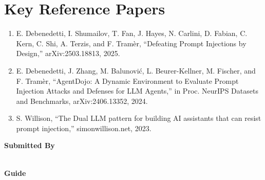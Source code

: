 \documentclass[11pt]{article}
\begin{document}
\section*{Key Reference Papers}
\begin{enumerate}
  \item E. Debenedetti, I. Shumailov, T. Fan, J. Hayes, N. Carlini, D. Fabian, C. Kern, C. Shi, A. Terzis, and F. Tram\`{e}r, ``Defeating Prompt Injections by Design,'' arXiv:2503.18813, 2025.
  \item E. Debenedetti, J. Zhang, M. Balunovi\'{c}, L. Beurer-Kellner, M. Fischer, and F. Tram\`{e}r, ``AgentDojo: A Dynamic Environment to Evaluate Prompt Injection Attacks and Defenses for LLM Agents,'' in Proc. NeurIPS Datasets and Benchmarks, arXiv:2406.13352, 2024.
  \item S. Willison, ``The Dual LLM pattern for building AI assistants that can resist prompt injection,'' simonwillison.net, 2023.
\end{enumerate}
\vspace{0.8em}
\noindent\textbf{Submitted By}\\
\seminarName\\
\seminarRoll

\vspace{0.6em}
\noindent\textbf{Guide}\\
\seminarGuide
\end{document}
